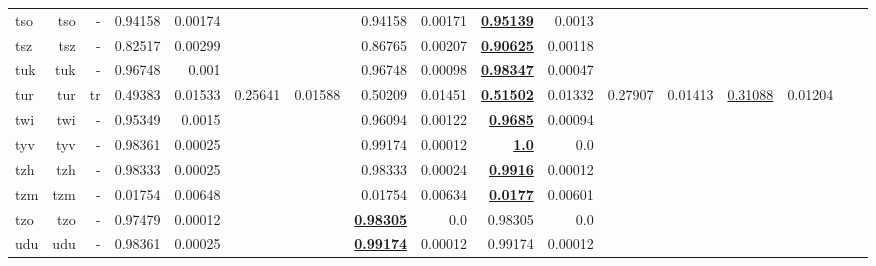 \documentclass[11pt]{article}
\begin{document}
\begin{table*}[h]
{\begin{tabular}{lrrrrrrrrrrrrrrrr}
tso         & tso         & -         & 0.94158         & 0.00174         &          &          & 0.94158         & 0.00171         & \textbf{\underline{0.95139}}         & 0.0013         &          &          &          &          \\
tsz         & tsz         & -         & 0.82517         & 0.00299         &          &          & 0.86765         & 0.00207         & \textbf{\underline{0.90625}}         & 0.00118         &          &          &          &          \\
tuk         & tuk         & -         & 0.96748         & 0.001         &          &          & 0.96748         & 0.00098         & \textbf{\underline{0.98347}}         & 0.00047         &          &          &          &          \\
tur         & tur         & tr         & 0.49383         & 0.01533         & 0.25641         & 0.01588         & 0.50209         & 0.01451         & \textbf{\underline{0.51502}}         & 0.01332         & 0.27907         & 0.01413         & \underline{0.31088}         & 0.01204         \\
twi         & twi         & -         & 0.95349         & 0.0015         &          &          & 0.96094         & 0.00122         & \textbf{\underline{0.9685}}         & 0.00094         &          &          &          &          \\
tyv         & tyv         & -         & 0.98361         & 0.00025         &          &          & 0.99174         & 0.00012         & \textbf{\underline{1.0}}         & 0.0         &          &          &          &          \\
tzh         & tzh         & -         & 0.98333         & 0.00025         &          &          & 0.98333         & 0.00024         & \textbf{\underline{0.9916}}         & 0.00012         &          &          &          &          \\
tzm         & tzm         & -         & 0.01754         & 0.00648         &          &          & 0.01754         & 0.00634         & \textbf{\underline{0.0177}}         & 0.00601         &          &          &          &          \\
tzo         & tzo         & -         & 0.97479         & 0.00012         &          &          & \textbf{\underline{0.98305}}         & 0.0         & 0.98305         & 0.0         &          &          &          &          \\
udu         & udu         & -         & 0.98361         & 0.00025         &          &          & \textbf{\underline{0.99174}}         & 0.00012         & 0.99174         & 0.00012         &          &          &          &          \\

\end{tabular}}
\end{table*}
\end{document}
